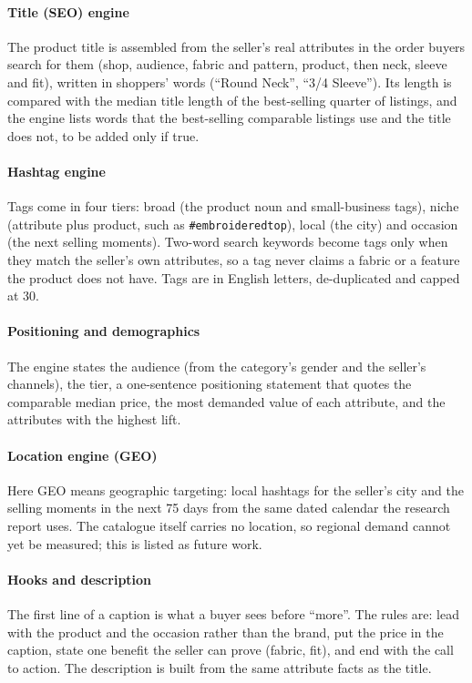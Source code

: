 \paragraph{Title (SEO) engine} The product title is assembled from the seller's real attributes in the order buyers search for them (shop, audience, fabric and pattern, product, then neck, sleeve and fit), written in shoppers' words (``Round Neck'', ``3/4 Sleeve''). Its length is compared with the median title length of the best-selling quarter of listings, and the engine lists words that the best-selling comparable listings use and the title does not, to be added only if true.

\paragraph{Hashtag engine} Tags come in four tiers: broad (the product noun and small-business tags), niche (attribute plus product, such as \texttt{\#embroideredtop}), local (the city) and occasion (the next selling moments). Two-word search keywords become tags only when they match the seller's own attributes, so a tag never claims a fabric or a feature the product does not have. Tags are in English letters, de-duplicated and capped at 30.

\paragraph{Positioning and demographics} The engine states the audience (from the category's gender and the seller's channels), the tier, a one-sentence positioning statement that quotes the comparable median price, the most demanded value of each attribute, and the attributes with the highest lift.

\paragraph{Location engine (GEO)} Here GEO means geographic targeting: local hashtags for the seller's city and the selling moments in the next 75 days from the same dated calendar the research report uses. The catalogue itself carries no location, so regional demand cannot yet be measured; this is listed as future work.

\paragraph{Hooks and description} The first line of a caption is what a buyer sees before ``more''. The rules are: lead with the product and the occasion rather than the brand, put the price in the caption, state one benefit the seller can prove (fabric, fit), and end with the call to action. The description is built from the same attribute facts as the title.

